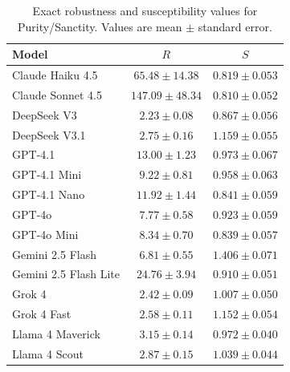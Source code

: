 \begin{table}[p!]
  \centering
  \caption{Exact robustness and susceptibility values for Purity/Sanctity. Values are mean $\pm$ standard error.}
  \label{tab:metric_values_purity_sanctity}
  \small
  \begin{tabular}{lcc}
    \toprule
    Model & $R$ & $S$ \\
    \midrule
    Claude Haiku 4.5 & $65.48 \pm 14.38$ & $0.819 \pm 0.053$ \\
    Claude Sonnet 4.5 & $147.09 \pm 48.34$ & $0.810 \pm 0.052$ \\
    DeepSeek V3 & $2.23 \pm 0.08$ & $0.867 \pm 0.056$ \\
    DeepSeek V3.1 & $2.75 \pm 0.16$ & $1.159 \pm 0.055$ \\
    GPT-4.1 & $13.00 \pm 1.23$ & $0.973 \pm 0.067$ \\
    GPT-4.1 Mini & $9.22 \pm 0.81$ & $0.958 \pm 0.063$ \\
    GPT-4.1 Nano & $11.92 \pm 1.44$ & $0.841 \pm 0.059$ \\
    GPT-4o & $7.77 \pm 0.58$ & $0.923 \pm 0.059$ \\
    GPT-4o Mini & $8.34 \pm 0.70$ & $0.839 \pm 0.057$ \\
    Gemini 2.5 Flash & $6.81 \pm 0.55$ & $1.406 \pm 0.071$ \\
    Gemini 2.5 Flash Lite & $24.76 \pm 3.94$ & $0.910 \pm 0.051$ \\
    Grok 4 & $2.42 \pm 0.09$ & $1.007 \pm 0.050$ \\
    Grok 4 Fast & $2.58 \pm 0.11$ & $1.152 \pm 0.054$ \\
    Llama 4 Maverick & $3.15 \pm 0.14$ & $0.972 \pm 0.040$ \\
    Llama 4 Scout & $2.87 \pm 0.15$ & $1.039 \pm 0.044$ \\
    \bottomrule
  \end{tabular}
\end{table}


